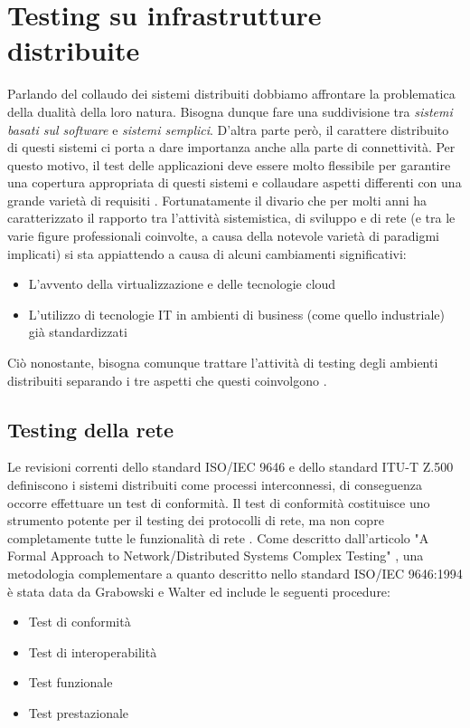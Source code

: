 \documentclass[../main.tex]{subfiles}
\begin{document}
\section{Testing su infrastrutture distribuite}
Parlando del collaudo dei sistemi distribuiti dobbiamo affrontare la problematica della dualità della loro natura. Bisogna dunque fare una suddivisione tra \textit{sistemi basati sul software} e \textit{sistemi semplici}\cite{disttest}.
D'altra parte però, il carattere distribuito di questi sistemi ci porta a dare importanza anche alla parte di connettività. Per questo motivo, il test delle applicazioni deve essere molto flessibile per garantire una copertura appropriata di questi sistemi e collaudare aspetti differenti con una grande varietà di requisiti \cite{disttestDelGado}.
Fortunatamente il divario che per molti anni ha caratterizzato il rapporto tra l'attività sistemistica, di sviluppo e di rete (e tra le varie figure professionali coinvolte, a causa della notevole varietà di paradigmi implicati) si sta appiattendo a causa di alcuni cambiamenti significativi:
\begin{itemize}
\item L'avvento della virtualizzazione e delle tecnologie cloud
\item L'utilizzo di tecnologie IT in ambienti di business (come quello industriale) già standardizzati
\end{itemize}
Ciò nonostante, bisogna comunque trattare l'attività di testing degli ambienti distribuiti separando i tre aspetti che questi coinvolgono \cite{disttest}.
\subsection{Testing della rete}
Le revisioni correnti dello standard ISO/IEC 9646 \cite{iso9646} e dello standard ITU-T Z.500 \cite{itutz500} definiscono i sistemi distribuiti come processi interconnessi, di conseguenza occorre effettuare un test di conformità. Il test di conformità costituisce uno strumento potente per il testing dei protocolli di rete, ma non copre completamente tutte le funzionalità di rete \cite{tretmans}.
Come descritto dall'articolo "A Formal Approach to Network/Distributed Systems Complex Testing" \cite{disttest}, una metodologia complementare a quanto descritto nello standard ISO/IEC 9646:1994 è stata data da Grabowski e Walter \cite{disttestWalterGrabowski1} \cite{disttestWalterGrabowski2} ed include le seguenti procedure:
\begin{itemize}
\item Test di conformità
\item Test di interoperabilità
\item Test funzionale
\item Test prestazionale
\end{itemize}
\end{document}
